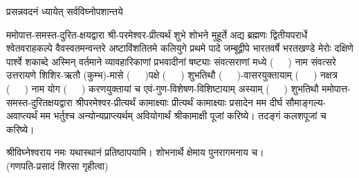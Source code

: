 
\setlength{\parindent}{0pt}


 

{प्रसन्नवदनं ध्यायेत् सर्वविघ्नोपशान्तये}
 

ममोपात्त-समस्त-दुरित-क्षयद्वारा श्री-परमेश्वर-प्रीत्यर्थं शुभे शोभने मुहूर्ते अद्य ब्रह्मणः
द्वितीयपरार्धे श्वेतवराहकल्पे वैवस्वतमन्वन्तरे अष्टाविंशतितमे कलियुगे प्रथमे पादे
जम्बूद्वीपे भारतवर्षे भरतखण्डे मेरोः दक्षिणे पार्श्वे शकाब्दे अस्मिन् वर्तमाने व्यावहारिकाणां
प्रभवादीनां षष्ट्याः संवत्सराणां मध्ये \mbox{(~~~)} नाम संवत्सरे उत्तरायणे 
शिशिर-ऋतौ (कुम्भ)-मासे \mbox{(~~~)}पक्षे \mbox{(~~~)} शुभतिथौ \mbox{(~~~)}-वासरयुक्तायाम्
\mbox{(~~~)} नक्षत्र \mbox{(~~~)} नाम योग  \mbox{(~~~)} करण\-युक्तायां च एवं-गुण-विशेषण-विशिष्टायाम्
अस्याम् \mbox{(~~~)} शुभतिथौ 
ममोपात्त-समस्त-दुरितक्षयद्वारा श्रीपरमेश्वर-प्रीत्यर्थं कामाक्ष्याः प्रीत्यर्थं कामाक्ष्याः प्रसादेन मम दीर्घ सौमाङ्गल्य-अवाप्त्यर्थं मम भर्तुश्च अन्योन्यप्राप्त्यर्थम् अवियोगार्थं श्रीकामाक्षी पूजां करिष्ये।
तदङ्गं कलशपूजां च करिष्ये। 


श्रीविघ्नेश्वराय नमः यथास्थानं प्रतिष्ठापयामि। शोभनार्थे क्षेमाय पुनरागमनाय च।\\
(गणपति-प्रसादं शिरसा गृहीत्वा)













